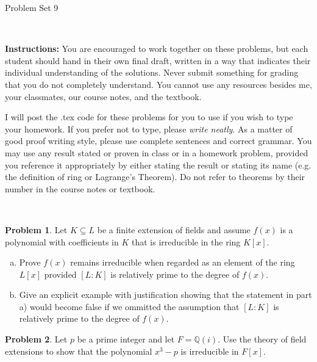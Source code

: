 \documentclass[11pt]{article}
\title{}
\date{\vspace{-0.5in}}
\newcommand{\Q}{\mathbb{Q}}
\theoremstyle{definition}
\newtheorem{problem}{Problem}
\begin{document}
\thispagestyle{fancy}
\pagestyle{fancy}

\vspace{3em}

\begin{center}
	{\LARGE Problem Set 9}
\end{center}

\

\noindent
{\bf Instructions:}
You are encouraged to work together on these problems, but each student should hand in their own final draft, written in a way that indicates their individual understanding of the solutions. Never submit something for grading that you do not completely understand. You cannot use any resources besides me, your classmates, our course notes, and the textbook.


I will post the .tex code for these problems for you to use if you wish to type your homework. If you prefer not to type, please  {\em write neatly}. As a matter of good proof writing style, please use complete sentences and correct grammar. You may use any result  stated or proven in class or in a homework problem, provided you reference it appropriately by either stating the result or stating its name (e.g. the definition of ring or Lagrange's Theorem). Do not refer to theorems by their number in the course notes or textbook.


\

\begin{problem}
Let $K \subseteq L$ be a finite extension of fields and assume $f(x)$ is a polynomial with coefficients in $K$ that is irreducible in the ring $K[x]$. 

\begin{enumerate}[a)]
\item Prove $f(x)$ remains irreducible when regarded as an element of the ring $L[x]$ provided $[L : K]$ is relatively prime to the degree of $f(x)$.

\item Give an explicit example with justification showing that the statement in part a) would become false if we ommitted the assumption that $[L : K]$ is relatively prime to the degree of $f(x)$.
\end{enumerate}
\end{problem}


\begin{problem}
Let $p$ be a prime integer and let $F = \Q(i)$. Use the theory of field extensions to show that the polynomial $x^3 - p$ is irreducible in $F[x]$.
\end{problem}
\end{document}
